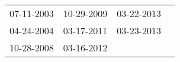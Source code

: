 \begin{supertabular}{llll}
 07-11-2003 &  10-29-2009 &  03-22-2013 \\
 04-24-2004 &  03-17-2011 &  03-23-2013 \\
 10-28-2008 &  03-16-2012 &             \\
\end{supertabular}
